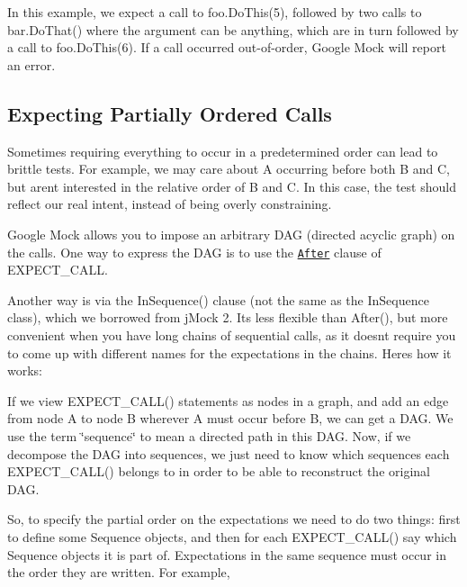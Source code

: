 In this example, we expect a call to {\ttfamily foo.\+Do\+This(5)}, followed by two calls to {\ttfamily bar.\+Do\+That()} where the argument can be anything, which are in turn followed by a call to {\ttfamily foo.\+Do\+This(6)}. If a call occurred out-\/of-\/order, Google Mock will report an error.

\subsection*{Expecting Partially Ordered Calls}

Sometimes requiring everything to occur in a predetermined order can lead to brittle tests. For example, we may care about {\ttfamily A} occurring before both {\ttfamily B} and {\ttfamily C}, but aren\textquotesingle{}t interested in the relative order of {\ttfamily B} and {\ttfamily C}. In this case, the test should reflect our real intent, instead of being overly constraining.

Google Mock allows you to impose an arbitrary D\+AG (directed acyclic graph) on the calls. One way to express the D\+AG is to use the \href{CheatSheet.md#the-after-clause}{\tt After} clause of {\ttfamily E\+X\+P\+E\+C\+T\+\_\+\+C\+A\+LL}.

Another way is via the {\ttfamily In\+Sequence()} clause (not the same as the {\ttfamily In\+Sequence} class), which we borrowed from j\+Mock 2. It\textquotesingle{}s less flexible than {\ttfamily After()}, but more convenient when you have long chains of sequential calls, as it doesn\textquotesingle{}t require you to come up with different names for the expectations in the chains. Here\textquotesingle{}s how it works\+:

If we view {\ttfamily E\+X\+P\+E\+C\+T\+\_\+\+C\+A\+L\+L()} statements as nodes in a graph, and add an edge from node A to node B wherever A must occur before B, we can get a D\+AG. We use the term \char`\"{}sequence\char`\"{} to mean a directed path in this D\+AG. Now, if we decompose the D\+AG into sequences, we just need to know which sequences each {\ttfamily E\+X\+P\+E\+C\+T\+\_\+\+C\+A\+L\+L()} belongs to in order to be able to reconstruct the original D\+AG.

So, to specify the partial order on the expectations we need to do two things\+: first to define some {\ttfamily Sequence} objects, and then for each {\ttfamily E\+X\+P\+E\+C\+T\+\_\+\+C\+A\+L\+L()} say which {\ttfamily Sequence} objects it is part of. Expectations in the same sequence must occur in the order they are written. For example,



